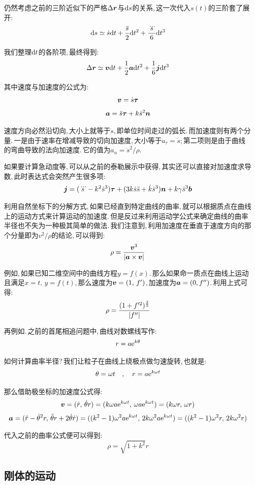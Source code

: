仍然考虑之前的三阶近似下的严格$\Delta \boldsymbol{r}$与$\textrm{d}{s}$的关系,\,这一次代入$s(t)$的三阶套了展开:
\[\textrm{d} s\simeq \dot{s}\textrm{d} t+\frac{\ddot{s}}{2}\textrm{d} t^2+\frac{\dddot{s}}{6}\textrm{d} t^3\]

我们整理$\textrm{d} t$的各阶项,\,最终得到:
\[\Delta \boldsymbol{r}\simeq \boldsymbol{v}\textrm{d} t+\frac{1}{2}\boldsymbol{a}\textrm{d} t^2+\frac{1}{6}\boldsymbol{j}\textrm{d} t^3\]

其中速度与加速度的公式为:
\[\boldsymbol{v}=\dot{s}\boldsymbol{\tau}\]
\[\boldsymbol{a}=\ddot{s}\boldsymbol{\tau}+k\dot{s}^2\boldsymbol{n}\]

速度方向必然沿切向,\,大小上就等于$\dot{s}$,\,即单位时间走过的弧长.\,而加速度则有两个分量.\,一是由于速率在增减导致的切向加速度,\,大小等于$a_\tau=\ddot{s}$;\,第二项则是由于曲线的弯曲导致的法向加速度.\,它的值为$a_n=\dot{s}^2/\rho$.\,

如果要计算急动度等,\,可以从之前的泰勒展示中获得,\,其实还可以直接对加速度求导数,\,此时表达式会突然产生很多项:
\[\boldsymbol{j}=(\dddot{s}-k^2\dot{s}^3)\boldsymbol{\tau}+(3k\dot{s}\ddot{s}+\dot{k}\dot{s}^3)\boldsymbol{n}+k\gamma\dot{s}^3\boldsymbol{b}\]

利用自然坐标下的分解方式,\,如果已经直到特定曲线的曲率,\,就可以根据质点在曲线上的运动方式来计算运动的加速度.\,但是反过来利用运动学公式来确定曲线的曲率半径也不失为一种极其简单的做法.\,我们注意到,\,利用加速度在垂直于速度方向的那个分量即为$v^2/\rho$的结论,\,可以得到:
\[\rho=\frac{\boldsymbol{v}^3}{\left| \boldsymbol{a}\times\boldsymbol{v} \right|}\]

例如,\,如果已知二维空间中的曲线方程$y=f(x)$.\,那么如果命一质点在曲线上运动且满足$x=t,\,y=f(t)$,\,那么速度为$\boldsymbol{v}=(1,\,f')$,\,加速度为$\boldsymbol{a}=(0,f'')$.\,利用上式可得:
\[\rho=\frac{(1+f'^2)^\frac{3}{2}}{\left| f'' \right|}\]

再例如.\,之前的首尾相追问题中,\,曲线对数螺线写作:
\[r=a{\rm e}^{k\theta}\]

如何计算曲率半径?\,我们让粒子在曲线上绕极点做匀速旋转,\,也就是:
\[\theta=\omega t\quad,\quad r=a{\rm e}^{k\omega t}\]

那么借助极坐标的加速度公式得:
\[\boldsymbol{v}=(\dot{r},\,\dot{\theta}r)=(k\omega a{\rm e}^{k\omega t},\,\omega a{\rm e}^{k\omega t})=(k\omega r,\,\omega r)\]
\[\boldsymbol{a}=(\ddot{r}-\dot{\theta}^2r,\,\ddot{\theta}r+2\dot{\theta}\dot{r})=((k^2-1)\omega^2 a{\rm e}^{k\omega t},\,2k\omega^2 a{\rm e}^{k\omega t})=((k^2-1)\omega^2 r,\,2k\omega^2 r)\]

代入之前的曲率公式便可以得到:
\[\rho=\sqrt{1+k^2}r\]

\subsection{刚体的运动}

